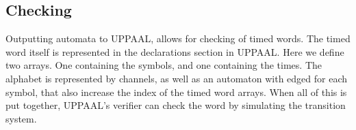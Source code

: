 \subsection{Checking}\label{subsec:checking}

Outputting automata to UPPAAL, allows for checking of timed words. The timed word itself is represented in the declarations section in UPPAAL.
Here we define two arrays. One containing the symbols, and one containing the times. 
The alphabet is represented by channels, as well as an automaton with edged for each symbol, that also increase the index of the timed word arrays.
When all of this is put together, UPPAAL's verifier can check the word by simulating the transition system. 